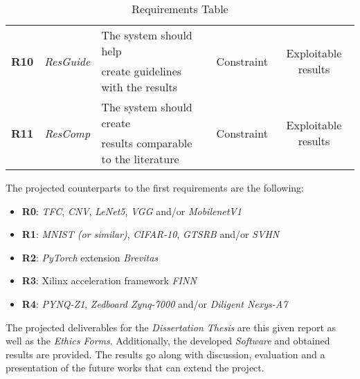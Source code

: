 \begin{table}[!]
{\begin{tabular}{| c c l c c |}
    \multirow{2}{*}{\textbf{R10}} & \multirow{2}{*}{\emph{ResGuide}}        & The system should help                                                 & \multirow{2}{*}{Constraint} & \multirow{2}{*}{Exploitable results}\\
                                  &                                         & create guidelines with the results                                     &                             & \\ \hline
    \multirow{2}{*}{\textbf{R11}} & \multirow{2}{*}{\emph{ResComp}}         & The system should create                                               & \multirow{2}{*}{Constraint} & \multirow{2}{*}{Exploitable results}\\
                                  &                                         & results comparable to the literature                                   &                             & \\ \hline
  \end{tabular}
  }
\caption[Requirements Table]{Requirements Table}
  \label{tab:RequirementsTable}
\end{table}

The projected counterparts to the first requirements are the following:
\begin{itemize}
  \item \textbf{R0}: \emph{TFC}, \emph{CNV}, \emph{LeNet5}, \emph{VGG} and/or \emph{MobilenetV1}
  \item \textbf{R1}: \emph{MNIST (or similar)}, \emph{CIFAR-10}, \emph{GTSRB} and/or \emph{SVHN}
  \item \textbf{R2}: \emph{PyTorch} extension \emph{Brevitas}
  \item \textbf{R3}: Xilinx acceleration framework \emph{FINN}
  \item \textbf{R4}: \emph{PYNQ-Z1}, \emph{Zedboard Zynq-7000} and/or \emph{Diligent Nexys-A7}
\end{itemize}

The projected deliverables for the \emph{Dissertation Thesis} are this given report as well as the \emph{Ethics Forms}. Additionally, the developed \emph{Software} and obtained results are provided. The results go along with discussion, evaluation and a presentation of the future works that can extend the project.


